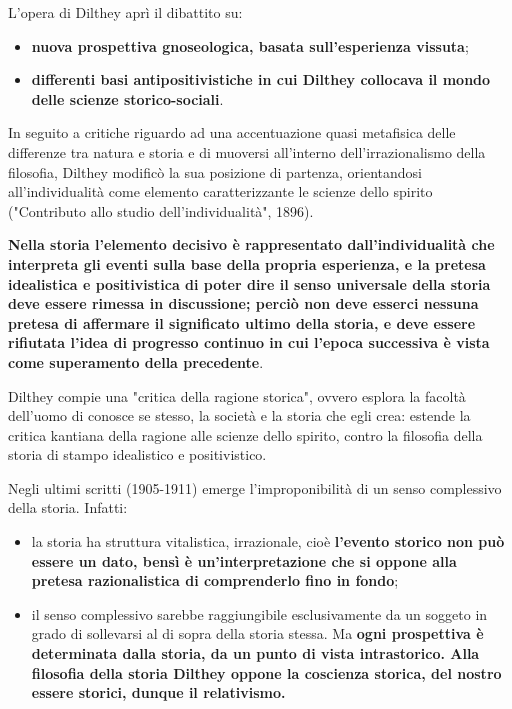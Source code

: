 L'opera di Dilthey aprì il dibattito su:

\begin{itemize}
	\item \textbf{nuova prospettiva gnoseologica, basata sull'esperienza vissuta};
	\item \textbf{differenti basi antipositivistiche  in cui Dilthey collocava il mondo delle scienze storico-sociali}.
\end{itemize}  

In seguito a critiche riguardo ad una accentuazione quasi metafisica delle differenze tra natura e storia e di muoversi all'interno dell'irrazionalismo della filosofia, Dilthey modificò la sua posizione di partenza, orientandosi all'individualità come elemento caratterizzante le scienze dello spirito ("Contributo allo studio dell'individualità", 1896).

\textbf{Nella storia l'elemento decisivo è rappresentato dall'individualità che interpreta gli eventi sulla base della propria esperienza, e la pretesa idealistica e positivistica di poter dire il senso universale della storia deve essere rimessa in discussione; perciò non deve esserci nessuna pretesa di affermare il significato ultimo della storia, e deve essere rifiutata l'idea di progresso continuo in cui l'epoca successiva è vista come superamento della precedente}.

Dilthey compie una "critica della ragione storica", ovvero esplora la facoltà dell'uomo di conosce se stesso, la società e la storia che egli crea: estende la critica kantiana della ragione alle scienze dello spirito, contro la filosofia della storia di stampo idealistico e positivistico.

Negli ultimi scritti (1905-1911) emerge l'improponibilità di un senso complessivo della storia. Infatti:

\begin{itemize}
	\item la storia ha struttura vitalistica, irrazionale, cioè \textbf{l'evento storico non può essere un dato, bensì è un'interpretazione che si oppone alla pretesa razionalistica di comprenderlo fino in fondo};
	\item il senso complessivo sarebbe raggiungibile esclusivamente da un soggeto in grado di sollevarsi al di sopra della storia stessa. Ma \textbf{ogni prospettiva è determinata dalla storia, da un punto di vista intrastorico. Alla filosofia della storia Dilthey oppone la coscienza storica, del nostro essere storici, dunque il relativismo.}
\end{itemize} 


